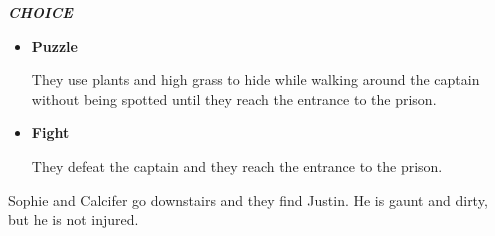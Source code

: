 \textit{\textbf{CHOICE}}
\begin{itemize}
  \item \textbf{Puzzle}
  
  They use plants and high grass to hide while walking around the captain without being spotted until they reach the entrance to the prison.

  \item \textbf{Fight}

  They defeat the captain and they reach the entrance to the prison.
\end{itemize}


Sophie and Calcifer go downstairs and they find Justin. He is gaunt and dirty, but he is not injured.

